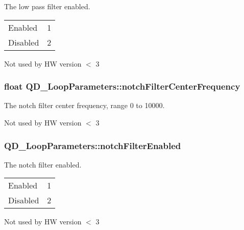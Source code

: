 The low pass filter enabled. \tabulinesep=1mm
\begin{longtabu} spread 0pt [c]{*2{|X[-1]}|}
\hline
Enabled&1 \\
Disabled&2 \\
\end{longtabu}


Not used by HW version $<$ 3
\subsubsection[{\texorpdfstring{notch\+Filter\+Center\+Frequency}{notchFilterCenterFrequency}}]{\setlength{\rightskip}{0pt plus 5cm}float Q\+D\+\_\+\+Loop\+Parameters\+::notch\+Filter\+Center\+Frequency}\hypertarget{struct_q_d___loop_parameters_a7d7ce315abd597354398c03a27e0b624}{}\label{struct_q_d___loop_parameters_a7d7ce315abd597354398c03a27e0b624}


The notch filter center frequency, range 0 to 10000. 

Not used by HW version $<$ 3
\subsubsection[{\texorpdfstring{notch\+Filter\+Enabled}{notchFilterEnabled}}]{ Q\+D\+\_\+\+Loop\+Parameters\+::notch\+Filter\+Enabled}\hypertarget{struct_q_d___loop_parameters_ac41734cc5dcf819b94a7062d484a095d}{}\label{struct_q_d___loop_parameters_ac41734cc5dcf819b94a7062d484a095d}


The notch filter enabled. \tabulinesep=1mm
\begin{longtabu} spread 0pt [c]{*2{|X[-1]}|}
\hline
Enabled&1 \\
Disabled&2 \\
\end{longtabu}


Not used by HW version $<$ 3
